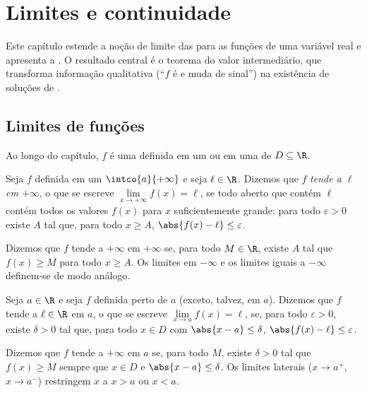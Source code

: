 \chapter{Limites e continuidade}\label{ch:g12:limcont}

Este capítulo estende a noção de limite das  para as funções de
uma variável real e apresenta a . O resultado central é o
teorema do valor intermediário, que transforma informação qualitativa
(``$f$ é  e muda de sinal'') na existência de soluções de
.

\section{Limites de funções}

Ao longo do capítulo, $f$ é uma  definida em um  ou em uma
 de  $D \subseteq \R$.

\begin{definition}\label{def:g12:limcont:liminf}
Seja $f$ definida em um  $\intco{a}{+\infty}$ e seja
$\ell \in \R$. Dizemos que $f$ \emph{tende a $\ell$ em
$+\infty$}, o que se escreve
$\lim\limits_{x\to+\infty} f(x) = \ell$, se todo  aberto que
contém $\ell$ contém todos os valores $f(x)$ para $x$ suficientemente
grande: para todo $\varepsilon > 0$ existe $A$ tal que, para todo
$x \geq A$, $\abs{f(x) - \ell} \leq \varepsilon$.

Dizemos que $f$ tende a $+\infty$ em $+\infty$ se, para todo $M \in \R$,
existe $A$ tal que $f(x) \geq M$ para todo $x \geq A$. Os limites em
$-\infty$ e os limites iguais a $-\infty$ definem-se de modo análogo.
\end{definition}

\begin{definition}\label{def:g12:limcont:limpoint}
Seja $a \in \R$ e seja $f$ definida perto de $a$ (exceto, talvez, em
$a$). Dizemos que $f$ tende a $\ell \in \R$ em $a$, o que se escreve
$\lim\limits_{x \to a} f(x) = \ell$, se, para todo $\varepsilon > 0$,
existe $\delta > 0$ tal que, para todo $x \in D$ com
$\abs{x - a} \leq \delta$, $\abs{f(x) - \ell} \leq \varepsilon$.

Dizemos que $f$ tende a $+\infty$ em $a$ se, para todo $M$, existe
$\delta > 0$ tal que $f(x) \geq M$ sempre que $x \in D$ e
$\abs{x - a} \leq \delta$. Os limites laterais ($x \to a^+$,
$x \to a^-$) restringem $x$ a $x > a$ ou $x < a$.
\end{definition}

